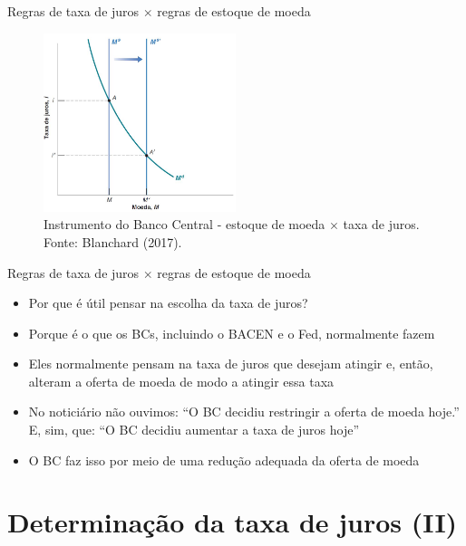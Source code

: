 \documentclass[10pt]{beamer}
\begin{document}
\begin{frame}{Regras de taxa de juros $\times$ regras de estoque de moeda}
    \begin{figure}
        \centering
        \includegraphics[width=0.5\textwidth]{./figures/aula072_fig4.JPG}
        \caption{Instrumento do Banco Central - estoque de moeda $\times$ taxa de juros. Fonte: Blanchard (2017).}
        \label{fig6}
    \end{figure}
\end{frame}

\begin{frame}{Regras de taxa de juros $\times$ regras de estoque de moeda}
    \begin{itemize}
        \item Por que é útil pensar na escolha da taxa de juros?
        \bigskip
        \item Porque é o que os BCs, incluindo o BACEN e o Fed, normalmente fazem
        \bigskip
        \item Eles normalmente pensam na taxa de juros que desejam atingir e, então, alteram a oferta de moeda de modo a atingir essa taxa
        \bigskip
        \item No noticiário não ouvimos: ``O BC decidiu restringir a oferta de moeda hoje.'' E, sim, que: ``O BC decidiu aumentar a taxa de juros hoje''
        \bigskip
        \item O BC faz isso por meio de uma redução adequada da oferta de moeda
        \hyperlink{apendice}{}
    \end{itemize}
\end{frame}

\section{Determinação da taxa de juros (II)}
\end{document}
